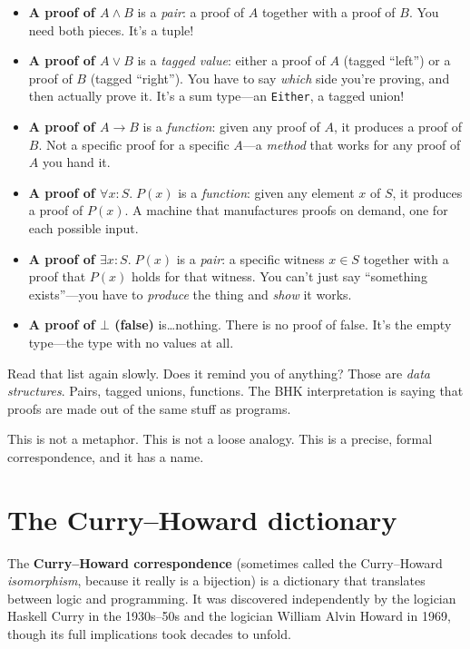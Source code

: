 \documentclass[11pt]{article}
\begin{document}
\begin{itemize}
  \item \textbf{A proof of $A \wedge B$} is a \emph{pair}: a proof of $A$ together with a proof of $B$. You need both pieces. It's a tuple!

  \item \textbf{A proof of $A \vee B$} is a \emph{tagged value}: either a proof of $A$ (tagged ``left'') or a proof of $B$ (tagged ``right''). You have to say \emph{which} side you're proving, and then actually prove it. It's a sum type---an \texttt{Either}, a tagged union!

  \item \textbf{A proof of $A \to B$} is a \emph{function}: given any proof of $A$, it produces a proof of $B$. Not a specific proof for a specific $A$---a \emph{method} that works for any proof of $A$ you hand it.

  \item \textbf{A proof of $\forall x : S.\; P(x)$} is a \emph{function}: given any element $x$ of $S$, it produces a proof of $P(x)$. A machine that manufactures proofs on demand, one for each possible input.

  \item \textbf{A proof of $\exists x : S.\; P(x)$} is a \emph{pair}: a specific witness $x \in S$ together with a proof that $P(x)$ holds for that witness. You can't just say ``something exists''---you have to \emph{produce} the thing and \emph{show} it works.

  \item \textbf{A proof of $\bot$ (false)} is\ldots nothing. There is no proof of false. It's the empty type---the type with no values at all.
\end{itemize}

Read that list again slowly. Does it remind you of anything? Those are \emph{data structures}. Pairs, tagged unions, functions. The BHK interpretation is saying that proofs are made out of the same stuff as programs.

This is not a metaphor. This is not a loose analogy. This is a precise, formal correspondence, and it has a name.

\section{The Curry--Howard dictionary}

The \textbf{Curry--Howard correspondence} (sometimes called the Curry--Howard \emph{isomorphism}, because it really is a bijection) is a dictionary that translates between logic and programming. It was discovered independently by the logician Haskell Curry in the 1930s--50s and the logician William Alvin Howard in 1969, though its full implications took decades to unfold.
\end{document}
